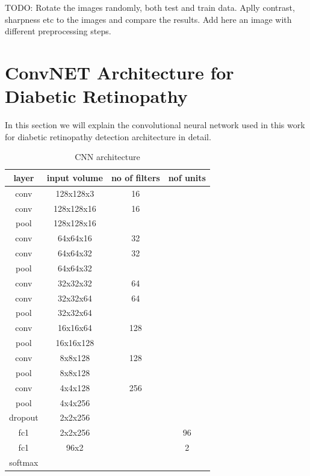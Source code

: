 TODO: Rotate the images randomly, both test and train data. 
Aplly contrast, sharpness etc to the images and compare the results. 
Add here an image with different preprocessing steps. 

\section{ConvNET Architecture for Diabetic Retinopathy}
In this section we will explain the convolutional neural network used in this work for diabetic retinopathy detection architecture in detail. 

\begin{table}[t]
\centering
\caption{CNN architecture} \label{tab:cnnarc}
\begin{tabular}{|c|c|c|c|} \hline
layer & input volume & no of filters & nof units \\ \hline
conv & 128x128x3 & 16 & \\ \hline
conv & 128x128x16 & 16 & \\ \hline
pool & 128x128x16 &  & \\ \hline
conv & 64x64x16 & 32 & \\ \hline
conv & 64x64x32 & 32 & \\ \hline
pool & 64x64x32 &  & \\ \hline
conv & 32x32x32 & 64  & \\ \hline
conv & 32x32x64 & 64  & \\ \hline
pool & 32x32x64 &   & \\ \hline
conv & 16x16x64 & 128  & \\ \hline
pool & 16x16x128 &   & \\ \hline
conv & 8x8x128 & 128  & \\ \hline
pool & 8x8x128 &   & \\ \hline
conv & 4x4x128 & 256  & \\ \hline
pool & 4x4x256 &   & \\ \hline
dropout & 2x2x256 & & \\ \hline
fc1 & 2x2x256 & &96 \\ \hline
fc1 & 96x2 & &2 \\ \hline
softmax & & & \\ \hline
\end{tabular}
\end{table}

